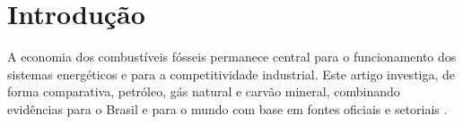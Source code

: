 \section{Introdu\c{c}\~ao}

A economia dos combust\'iveis f\'osseis permanece central para o funcionamento dos sistemas energ\'eticos e para a competitividade industrial. Este artigo investiga, de forma comparativa, petr\'oleo, g\'as natural e carv\~ao mineral, combinando evid\^encias para o Brasil e para o mundo com base em fontes oficiais e setoriais \cite{ben2026,ei2026}.
